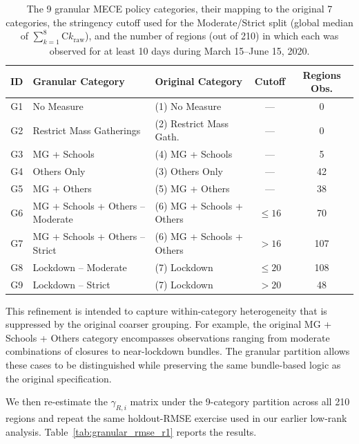 \documentclass[letterpaper,twoside,11pt]{reviewresponse}
\begin{document}
\begin{enumerate}
\begin{table}[h!]
	\centering
	\small
	\begin{tabular}{|c|l|l|c|c|}
		\hline
		\textbf{ID} & \textbf{Granular Category} & \textbf{Original Category} & \textbf{Cutoff} & \textbf{Regions Obs.} \\\hline
		G1 & No Measure & (1) No Measure & --- & 0 \\
		G2 & Restrict Mass Gatherings & (2) Restrict Mass Gath. & --- & 0 \\
		G3 & MG + Schools & (4) MG + Schools & --- & 5 \\
		G4 & Others Only & (3) Others Only & --- & 42 \\
		G5 & MG + Others & (5) MG + Others & --- & 38 \\
		G6 & MG + Schools + Others -- Moderate & (6) MG + Schools + Others & $\leq 16$ & 70 \\
		G7 & MG + Schools + Others -- Strict & (6) MG + Schools + Others & $> 16$ & 107 \\
		G8 & Lockdown -- Moderate & (7) Lockdown & $\leq 20$ & 108 \\
		G9 & Lockdown -- Strict & (7) Lockdown & $> 20$ & 48 \\\hline
	\end{tabular}
	\caption{The 9 granular MECE policy categories, their mapping to the original 7 categories, the stringency cutoff used for the Moderate/Strict split (global median of $\sum_{k=1}^{8} \text{C}k_{\text{raw}}$), and the number of regions (out of 210) in which each was observed for at least 10 days during March 15--June 15, 2020.}
	\label{tab:granular_policies_r1}
\end{table}

This refinement is intended to capture within-category heterogeneity that is suppressed by the original coarser grouping. For example, the original MG + Schools + Others category encompasses observations ranging from moderate combinations of closures to near-lockdown bundles. The granular partition allows these cases to be distinguished while preserving the same bundle-based logic as the original specification.

We then re-estimate the $\gamma_{R,i}$ matrix under the 9-category partition across all 210 regions and repeat the same holdout-RMSE exercise used in our earlier low-rank analysis. Table~\ref{tab:granular_rmse_r1} reports the results.


\end{enumerate}
\end{document}
